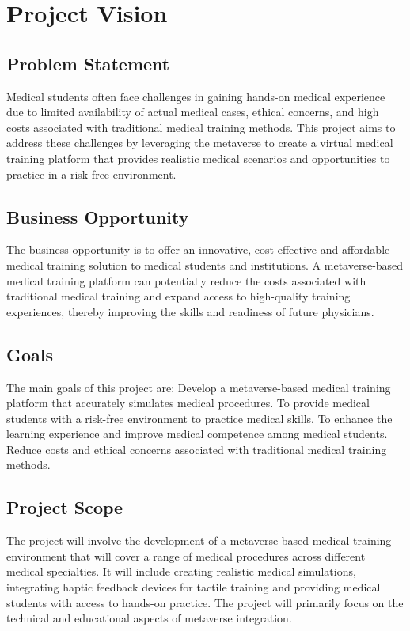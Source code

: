 \chapter{Project Vision}
\label{ch:vision}
\section{Problem Statement}
Medical students often face challenges in gaining hands-on medical experience due to limited availability of actual medical cases, ethical concerns, and high costs associated with traditional medical training methods. This project aims to address these challenges by leveraging the metaverse to create a virtual medical training platform that provides realistic medical scenarios and opportunities to practice in a risk-free environment.

\section{Business Opportunity}
The business opportunity is to offer an innovative, cost-effective and affordable medical training solution to medical students and institutions. A metaverse-based medical training platform can potentially reduce the costs associated with traditional medical training and expand access to high-quality training experiences, thereby improving the skills and readiness of future physicians.

\section{Goals}
The main goals of this project are:
Develop a metaverse-based medical training platform that accurately simulates medical procedures.
To provide medical students with a risk-free environment to practice medical skills.
To enhance the learning experience and improve medical competence among medical students.
Reduce costs and ethical concerns associated with traditional medical training methods.

\section{Project Scope}
The project will involve the development of a metaverse-based medical training environment that will cover a range of medical procedures across different medical specialties. It will include creating realistic medical simulations, integrating haptic feedback devices for tactile training and providing medical students with access to hands-on practice. The project will primarily focus on the technical and educational aspects of metaverse integration.

